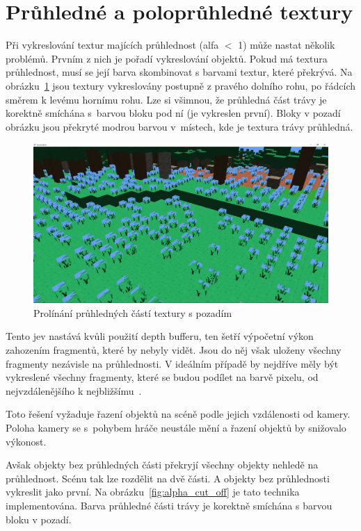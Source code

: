 \documentclass[thesis=M,czech]{FITthesis}[2019/12/23]
\begin{document}
\section{Průhledné a poloprůhledné textury}

Při vykreslování textur majících průhlednost (alfa $<$ 1) může nastat několik problémů. Prvním z nich je pořadí vykreslování objektů. Pokud má textura průhlednost, musí se její barva skombinovat s barvami textur, které překrývá. Na obrázku~\ref{fig:alpha} jsou textury vykreslovány postupně z pravého dolního rohu, po řádcích směrem k levému hornímu rohu. Lze si všimnou, že průhledná část trávy je korektně smíchána s~barvou bloku pod ní (je vykreslen první). Bloky v pozadí obrázku jsou překryté modrou barvou v~místech, kde je textura trávy průhledná.

\begin{figure}\centering
	\includegraphics[width=\textwidth]{images/alpha}
	\caption[Prolínání průhledných částí textury s pozadím]{Prolínání průhledných částí textury s pozadím}\label{fig:alpha}
\end{figure}

Tento jev nastává kvůli použití depth bufferu, ten šetří výpočetní výkon zahozením fragmentů, které by nebyly vidět. Jsou do něj však uloženy všechny fragmenty nezávisle na průhlednosti. V ideálním případě by nejdříve měly být vykreslené všechny fragmenty, které se budou podílet na barvě pixelu, od nejvzdálenějšího k nejbližšímu~\cite{lopgl_blend}.

Toto řešení vyžaduje řazení objektů na scéně podle jejich vzdálenosti od kamery. Poloha kamery se s~pohybem hráče neustále mění a řazení objektů by snižovalo výkonost.

Avšak objekty bez průhledných části překryjí všechny objekty nehledě na průhlednost. Scénu tak lze rozdělit na dvě části. A objekty bez průhlednosti vykreslit jako první. Na obrázku~\ref{fig:alpha_cut_off} je tato technika implementována. Barva průhledné části trávy je korektně smíchána s barvou bloku v pozadí.
\end{document}
